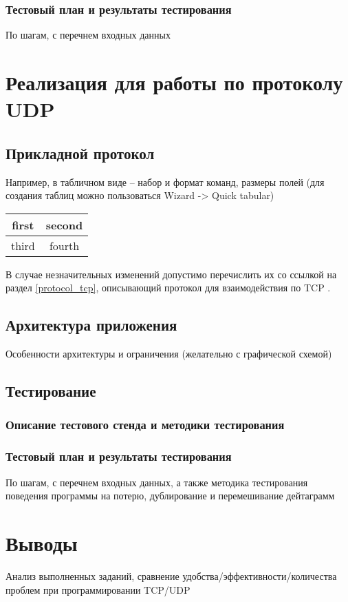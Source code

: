 \documentclass[12pt,a4paper]{report}
\begin{document}
\subsection{Тестовый план и результаты тестирования}
По шагам, с перечнем входных данных

\chapter{Реализация для работы по протоколу UDP}
\section{Прикладной протокол}

Например, в табличном виде -- набор и формат команд, размеры полей
(для создания таблиц можно пользоваться Wizard -> Quick tabular)


\begin{tabular}{|c|c|}
\hline
first & second \\
\hline
third & fourth \\
\hline
\end{tabular}


В случае незначительных изменений допустимо перечислить их со ссылкой на раздел \ref{protocol_tcp}, описывающий протокол для взаимодействия по TCP .

\section{Архитектура приложения}
Особенности архитектуры и ограничения (желательно с графической схемой)

\section{Тестирование}
\subsection{Описание тестового стенда и методики тестирования}
\subsection{Тестовый план и результаты тестирования}
По шагам, с перечнем входных данных,
а также  методика тестирования поведения программы на потерю, дублирование и перемешивание дейтаграмм

\chapter{Выводы}
Анализ выполненных заданий, сравнение удобства/эффективности/количества проблем при программировании TCP/UDP
\end{document}
